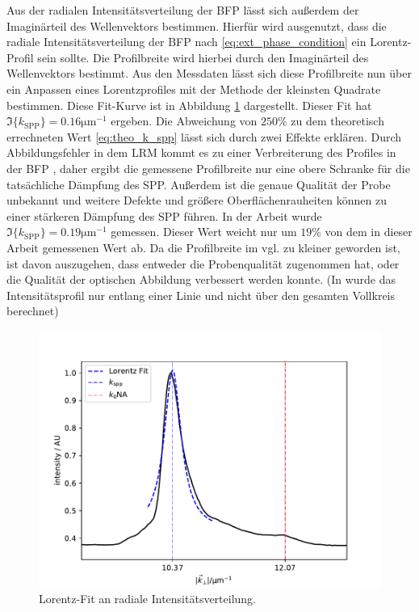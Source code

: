 \documentclass[titlepage]{article}
\begin{document}
		Aus der radialen Intensitätsverteilung der BFP lässt sich außerdem der Imaginärteil des Wellenvektors bestimmen. Hierfür  wird ausgenutzt, dass die radiale Intensitätsverteilung der BFP nach \eqref{eq:ext_phase_condition} ein Lorentz-Profil sein sollte. Die Profilbreite wird hierbei durch den Imaginärteil des Wellenvektors bestimmt. Aus den Messdaten lässt sich diese Profilbreite nun über ein Anpassen eines Lorentzprofiles mit der Methode der kleinsten Quadrate bestimmen. Diese Fit-Kurve ist in Abbildung \ref{fig:lorenz_profile} dargestellt. Dieser Fit hat $\Im\{k_\mathrm{SPP}\} = 0.16 \mathrm{\mu m}^{-1}$ ergeben. Die Abweichung von $250\%$ zu dem theoretisch errechneten Wert \ref{eq:theo_k_spp} lässt sich durch zwei Effekte erklären. Durch Abbildungsfehler in dem LRM kommt es zu einer Verbreiterung des Profiles in der BFP \cite{Jaruschewski.2020}, daher ergibt die gemessene Profilbreite nur eine obere Schranke für die tatsächliche Dämpfung des SPP. Außerdem ist die genaue Qualität der Probe unbekannt und weitere Defekte und größere Oberflächenrauheiten können zu einer stärkeren Dämpfung des SPP führen. In der Arbeit \cite{Jaruschewski.2020} wurde  $\Im\{k_\mathrm{SPP}\} = 0.19 \mathrm{\mu m}^{-1}$ gemessen. Dieser Wert weicht nur um $19\%$ von dem in dieser Arbeit gemessenen Wert ab. Da die Profilbreite im vgl. zu \cite{Jaruschewski.2020} kleiner geworden ist, ist davon auszugehen, dass entweder die Probenqualität zugenommen hat, oder die Qualität der optischen Abbildung verbessert werden konnte. (In \cite{Jaruschewski.2020} wurde das Intensitätsprofil nur entlang einer Linie und nicht über den gesamten Vollkreis berechnet)
		\begin{figure}[h]
			\centering
			\includegraphics[width=0.7\linewidth]{figures/lorenz_profile}
			\caption{Lorentz-Fit an radiale Intensitätsverteilung.}
			\label{fig:lorenz_profile}
		\end{figure}
		
\end{document}
